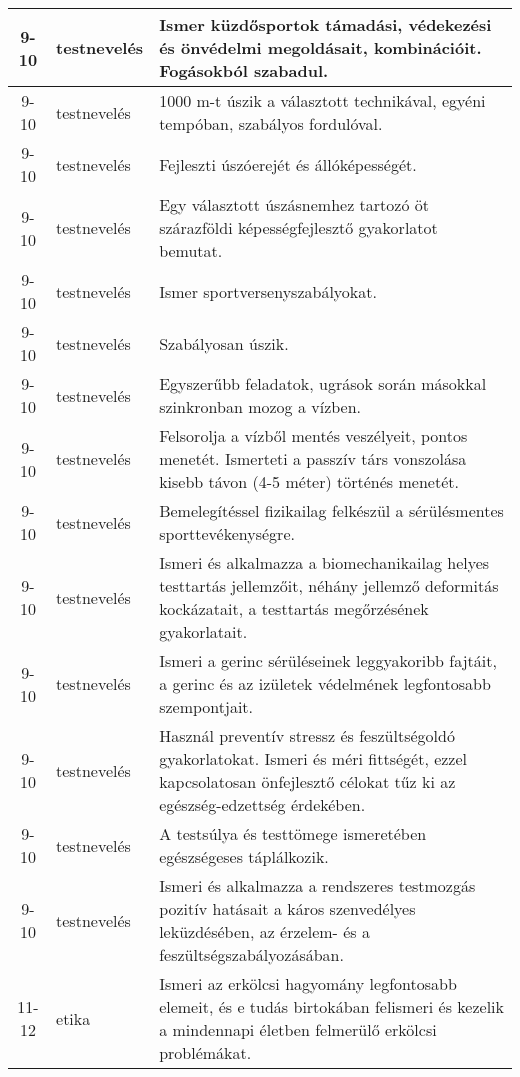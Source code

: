 \begin{small}
\begin{longtable}{c | p{2cm} |  p{11cm} }
              9-10 & testnevelés & Ismer küzdősportok támadási, védekezési és önvédelmi megoldásait, kombinációit. Fogásokból szabadul. \\ \hline
              9-10 & testnevelés & 1000 m-t  úszik a választott technikával, egyéni tempóban, szabályos fordulóval. \\ \hline
              9-10 & testnevelés & Fejleszti úszóerejét és állóképességét. \\ \hline
              9-10 & testnevelés & Egy választott úszásnemhez tartozó öt szárazföldi képességfejlesztő gyakorlatot bemutat. \\ \hline
              9-10 & testnevelés & Ismer sportversenyszabályokat. \\ \hline
              9-10 & testnevelés & Szabályosan úszik. \\ \hline
              9-10 & testnevelés & Egyszerűbb feladatok, ugrások során másokkal szinkronban mozog a vízben. \\ \hline
              9-10 & testnevelés & Felsorolja a vízből mentés veszélyeit, pontos menetét. Ismerteti a passzív társ vonszolása kisebb távon (4-5 méter) történés menetét. \\ \hline
              9-10 & testnevelés & Bemelegítéssel fizikailag felkészül a sérülésmentes sporttevékenységre. \\ \hline
              9-10 & testnevelés & Ismeri és alkalmazza a biomechanikailag helyes testtartás jellemzőit, néhány jellemző deformitás kockázatait, a testtartás megőrzésének gyakorlatait. \\ \hline
              9-10 & testnevelés & Ismeri a gerinc sérüléseinek leggyakoribb fajtáit, a gerinc és az izületek védelmének legfontosabb szempontjait. \\ \hline
              9-10 & testnevelés & Használ preventív stressz és feszültségoldó gyakorlatokat. Ismeri és méri fittségét, ezzel kapcsolatosan önfejlesztő célokat tűz ki az egészség-edzettség érdekében. \\ \hline
              9-10 & testnevelés & A testsúlya és testtömege ismeretében egészségeses táplálkozik. \\ \hline
              9-10 & testnevelés & Ismeri és alkalmazza a rendszeres testmozgás pozitív hatásait a káros szenvedélyes leküzdésében, az érzelem- és a feszültségszabályozásában. \\ \hline
              11-12 & etika & Ismeri az erkölcsi hagyomány legfontosabb elemeit, és e tudás birtokában felismeri és kezelik a mindennapi életben felmerülő erkölcsi problémákat. \\ \hline

\end{longtable}
\end{small}
